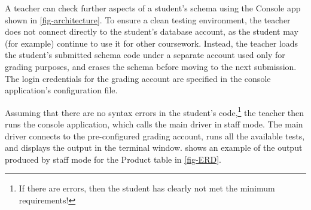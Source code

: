 \documentclass[sigconf, review, anonymous, capitalise]{acmart}
\begin{document}
A teacher can check further aspects of a student's schema using the \textsf{Console app} shown in \cref{fig-architecture}. To ensure a clean testing environment, the teacher does not connect directly to the student's database account, as the student may (for example) continue to use it for other coursework. Instead, the teacher loads the student's submitted schema code under a separate account used only for grading purposes, and erases the schema before moving to the next submission. The login credentials for the grading account are specified in the console application's configuration file.

Assuming that there are no syntax errors in the student's code,\footnote{If there are errors, then the student has clearly not met the minimum requirements!} the teacher then runs the console application, which calls the main driver in staff mode. The main driver connects to the pre-configured grading account, runs all the available tests, and displays the output in the terminal window.  shows an example of the output produced by staff mode for the \textsf{Product} table in \cref{fig-ERD}.




\newlength{\dothskip}
\setlength{\dothskip}{0.72cm}
\newlength{\dotvskip}
\setlength{\dotvskip}{-1.25ex}
\newlength{\codeskip}
\setlength{\codeskip}{-0.5ex}
\end{document}
